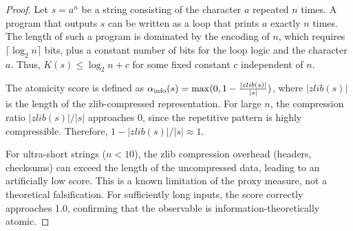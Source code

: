 \begin{proof}
Let $s = a^n$ be a string consisting of the character $a$ repeated $n$ times. A program that outputs $s$ can be written as a loop that prints $a$ exactly $n$ times. The length of such a program is dominated by the encoding of $n$, which requires $\lceil\log_2 n\rceil$ bits, plus a constant number of bits for the loop logic and the character $a$. Thus, $K(s) \le \log_2 n + c$ for some fixed constant $c$ independent of $n$.

The atomicity score is defined as $\alpha_{\text{info}}(s) = \max(0, 1 - \frac{|zlib(s)|}{|s|})$, where $|zlib(s)|$ is the length of the zlib-compressed representation. For large $n$, the compression ratio $|zlib(s)| / |s|$ approaches $0$, since the repetitive pattern is highly compressible. Therefore, $1 - |zlib(s)|/|s| \approx 1$.

For ultra-short strings ($n < 10$), the zlib compression overhead (headers, checksums) can exceed the length of the uncompressed data, leading to an artificially low score. This is a known limitation of the proxy measure, not a theoretical falsification. For sufficiently long inputs, the score correctly approaches 1.0, confirming that the observable is information-theoretically atomic.
\end{proof}